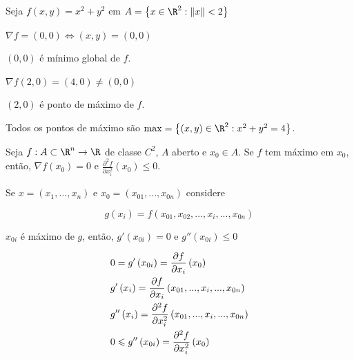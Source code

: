 \documentclass[11pt, oneside, a4paper]{gsm-l}
\begin{document}
\begin{exem}
    Seja $f\left( {x,y} \right) = x^2  + y^2$ em $A = \left\{ {x \in \R^2 :\left\| x \right\| < 2} \right\}$
\end{exem}

\begin{sol}
    $\nabla f = \left( {0,0} \right) \Leftrightarrow \left( {x,y} \right) = \left( {0,0} \right)$

$\left( {0,0} \right)$ é mínimo global de $f$.

$\nabla f\left( {2,0} \right) = \left( {4,0} \right) \ne \left( {0,0} \right)$

$\left( {2,0} \right)$ é ponto de máximo de $f$.

    Todos os pontos de máximo são $\max  = \left\{ {\left( {x,y} \right) \in \R^2 :x^2  + y^2  = 4} \right\}$.
\end{sol}

\begin{teo}
    Seja $f:A \subset \R^n \to \R$ de classe $C^2$, $A$ aberto e $x_0 \in A$. Se $f$ tem máximo em $x_0$, então, $\nabla f\left( {x_0 } \right) = 0$ e $\displaystyle \frac{{\partial ^2 f}}{{\partial x_i^2 }}\left( {x_0 } \right) \leqslant 0$.
\end{teo}

\begin{dem}
    Se $x = \left( {x_1 ,...,x_n } \right)$ e $x_0  = \left( {x_{01} ,...,x_{0n} } \right)$ considere

\[
    g\left( {x_i } \right) = f\left( {x_{01} ,x_{02} ,...,x_i ,...,x_{0n} } \right)
\]

    $x_{0i}$ é máximo de $g$, então, $g'\left( {x_{0i} } \right) = 0$ e $g''\left( {x_{0i} } \right) \leqslant 0$

\[
\begin{gathered}
0 = g'\left( {x_{0i} } \right) = \frac{{\partial f}}
{{\partial x_i }}\left( {x_0 } \right) \hfill \\
g'\left( {x_i } \right) = \frac{{\partial f}}
{{\partial x_i }}\left( {x_{01} ,...,x_i ,...,x_{0n} } \right) \hfill \\
g''\left( {x_i } \right) = \frac{{\partial ^2 f}}
{{\partial x_i^2 }}\left( {x_{01} ,...,x_i ,...,x_{0n} } \right) \hfill \\
0 \leqslant g''\left( {x_{0i} } \right) = \frac{{\partial ^2 f}}
{{\partial x_i^2 }}\left( {x_0 } \right) \hfill \\
\end{gathered}
\]

\end{dem}
\end{document}
